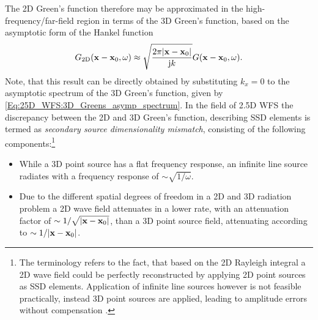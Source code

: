 \vspace{3mm}
The 2D Green's function therefore may be approximated in the high-frequency/far-field region in terms of the 3D Green's function, based on the asymptotic form of the Hankel function \cite{Williams1999}
\begin{equation}
G_{2\mathrm{D}}(\mathbf{x}- \mathbf{x}_0,\omega) \approx \sqrt{\frac{ 2\pi |\mathbf{x} - \mathbf{x}_0|}{\mathrm{j} k }}
G(\mathbf{x}-\mathbf{x}_0, \omega).
\label{eq:25D_WFS:2D_Greens_vs_3D} 
\end{equation}
Note, that this result can be directly obtained by substituting $k_x = 0$ to the asymptotic spectrum of the 3D Green's function, given by \eqref{Eq:25D_WFS:3D_Greens_asymp_spectrum}.
In the field of 2.5D WFS the discrepancy between the 2D and 3D Green's function, describing SSD elements is termed as \emph{secondary source dimensionality mismatch}, consisting of the following components:\footnote{The terminology refers to the fact, that based on the 2D Rayleigh integral a 2D wave field could be perfectly reconstructed by applying 2D point sources as SSD elements. Application of infinite line sources however is not feasible practically, instead 3D point sources are applied, leading to amplitude errors without compensation \cite{Spors2008:WFSrevisited}.}
\begin{itemize}
\item While a 3D point source has a flat frequency response, an infinite line source radiates with a frequency response of $\sim \sqrt{1/\omega}$. 
\item Due to the different spatial degrees of freedom in a 2D and 3D radiation problem a 2D wave field attenuates in a lower rate, with an attenuation factor of $\sim 1/\sqrt{|\mathbf{x}-\mathbf{x}_0|}$, than a 3D point source field, attenuating according to $\sim 1/|\mathbf{x}-\mathbf{x}_0|$.
\end{itemize}


